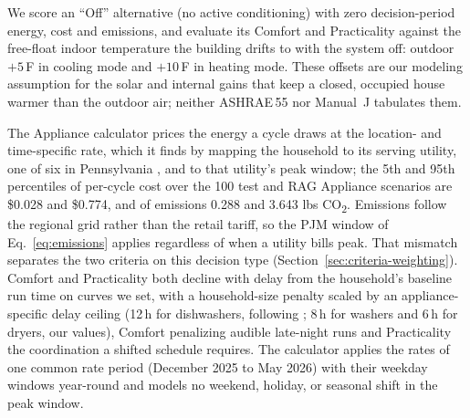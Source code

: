\documentclass[final,3p,times]{elsarticle}
\begin{document}
We score an ``Off'' alternative (no active conditioning) with zero decision-period energy, cost and emissions, and evaluate its Comfort and Practicality against the free-float indoor temperature the building drifts to with the system off: outdoor $+5$\,\textdegree{}F in cooling mode and $+10$\,\textdegree{}F in heating mode. These offsets are our modeling assumption for the solar and internal gains that keep a closed, occupied house warmer than the outdoor air; neither ASHRAE\,55 \cite{ashrae55_2020} nor Manual~J \cite{accamanualj} tabulates them.

The Appliance calculator prices the energy a cycle draws at the location- and time-specific rate, which it finds by mapping the household to its serving utility, one of six in Pennsylvania \cite{peco2021,peco2025tou,ppl2025supp402,ppl2025ptc,fepa_supp28,fepa_supp20,duquesne2026,paupc2025dec}, and to that utility's peak window; the 5th and 95th percentiles of per-cycle cost over the 100 test and RAG Appliance scenarios are \$0.028 and \$0.774, and of emissions 0.288 and 3.643 lbs CO\textsubscript{2}. Emissions follow the regional grid rather than the retail tariff, so the PJM window of Eq.~\ref{eq:emissions} applies regardless of when a utility bills peak. That mismatch separates the two criteria on this decision type (Section~\ref{sec:criteria-weighting}). Comfort and Practicality both decline with delay from the household's baseline run time on curves we set, with a household-size penalty scaled by an appliance-specific delay ceiling (12\,h for dishwashers, following \citet{paetz2012}; 8\,h for washers and 6\,h for dryers, our values), Comfort penalizing audible late-night runs and Practicality the coordination a shifted schedule requires. The calculator applies the rates of one common rate period (December 2025 to May 2026) with their weekday windows year-round and models no weekend, holiday, or seasonal shift in the peak window.
\end{document}
